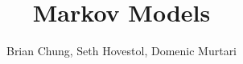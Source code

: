 \documentclass[12pt]{article}
\begin{document}
\title{Markov Models}
\author{Brian Chung, Seth Hovestol, Domenic Murtari}
\maketitle







\end{document}
